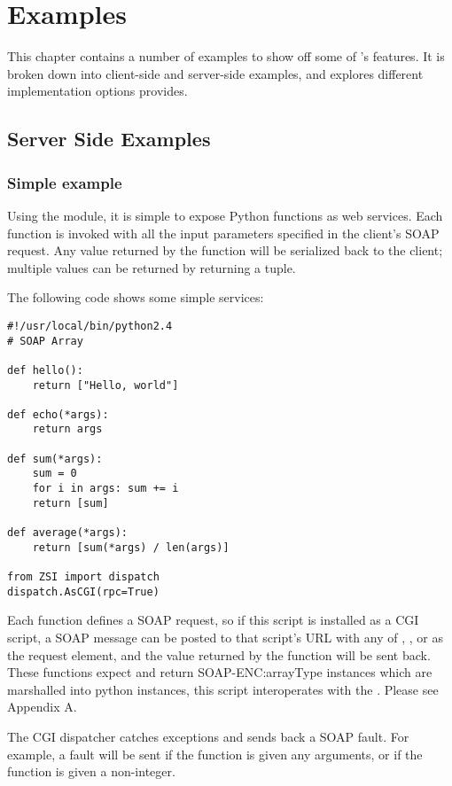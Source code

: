 \chapter{Examples}

This chapter contains a number of examples to show off some of \ZSI{}'s 
features.  It is broken down into client-side and server-side examples, and 
explores different implementation options \ZSI{} provides.

\section{Server Side Examples}
\subsection{Simple example}
Using the  module, it is simple to expose Python functions
as web services.  Each function is invoked with all the input parameters
specified in the client's SOAP request.  Any value returned by the function will
be serialized back to the client; multiple values can be returned by returning a
tuple.

The following code shows some simple services:

\begin{verbatim}
#!/usr/local/bin/python2.4
# SOAP Array

def hello():
    return ["Hello, world"]

def echo(*args):
    return args

def sum(*args):
    sum = 0
    for i in args: sum += i
	return [sum]

def average(*args):
    return [sum(*args) / len(args)]

from ZSI import dispatch
dispatch.AsCGI(rpc=True)
\end{verbatim}

Each function defines a SOAP request, so if this script is installed
as a CGI script, a SOAP message can be posted to that script's URL with any of
, , or  as the request element,
and the value returned by the function will be sent back.  These functions
expect and return SOAP-ENC:arrayType instances which are marshalled into python
 instances, this script interoperates with the 
.  Please see Appendix A.

The \ZSI{} CGI dispatcher catches exceptions and sends back a SOAP fault.
For example, a fault will be sent if the   function is given any
arguments, or if the  function is given a non-integer.

